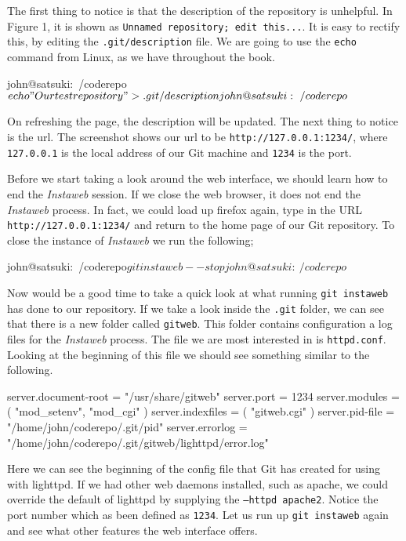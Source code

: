 
The first thing to notice is that the description of the repository is unhelpful.
In Figure 1, it is shown as \texttt{Unnamed repository; edit this...}.
It is easy to rectify this, by editing the \texttt{.git/description} file.
We are going to use the \texttt{echo} command from Linux, as we have throughout the book.

\begin{code}
john@satsuki:~/coderepo$ echo "Our test repository" > .git/description 
john@satsuki:~/coderepo$ 
\end{code}

On refreshing the page, the description will be updated.
The next thing to notice is the url.
The screenshot shows our url to be \texttt{http://127.0.0.1:1234/}, where \texttt{127.0.0.1} is the local address of our Git machine and \texttt{1234} is the port.

Before we start taking a look around the web interface, we should learn how to end the \emph{Instaweb} session.
If we close the web browser, it does not end the \emph{Instaweb} process.
In fact, we could load up firefox again, type in the URL \texttt{http://127.0.0.1:1234/} and return to the home page of our Git repository.
To close the instance of \emph{Instaweb} we run the following;

\begin{code}
john@satsuki:~/coderepo$ git instaweb --stop
john@satsuki:~/coderepo$ 
\end{code}

Now would be a good time to take a quick look at what running \texttt{git instaweb} has done to our repository.
If we take a look inside the \texttt{.git} folder, we can see that there is a new folder called \texttt{gitweb}.
This folder contains configuration a log files for the \emph{Instaweb} process.
The file we are most interested in is \texttt{httpd.conf}.
Looking at the beginning of this file we should see something similar to the following.

\begin{code}
server.document-root = "/usr/share/gitweb"
server.port = 1234
server.modules = ( "mod_setenv", "mod_cgi" )
server.indexfiles = ( "gitweb.cgi" )
server.pid-file = "/home/john/coderepo/.git/pid"
server.errorlog = "/home/john/coderepo/.git/gitweb/lighttpd/error.log"
\end{code}

Here we can see the beginning of the config file that Git has created for using with lighttpd.
If we had other web daemons installed, such as apache, we could override the default of lighttpd by supplying the \texttt{--httpd apache2}.
Notice the port number which as been defined as \texttt{1234}.
Let us run up \texttt{git instaweb} again and see what other features the web interface offers.


